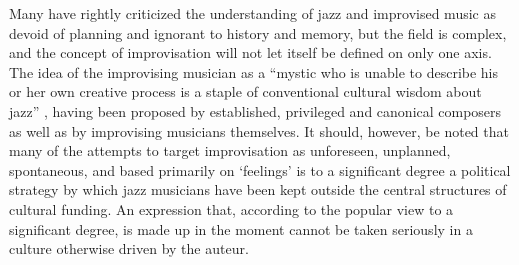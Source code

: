 \documentclass[a4paper]{article}
\begin{document}
Many have rightly criticized the understanding of jazz and improvised music as devoid of planning and ignorant to history and memory, but the field is complex, and the concept of improvisation will not let itself be defined on only one axis. The idea of the improvising musician as a ``mystic who is unable to describe his or her own creative process is a staple of conventional cultural wisdom about jazz''  \autocite[170]{lewis-1}, having been proposed by established, privileged and canonical composers as well as by improvising musicians themselves. It should, however, be noted that many of the attempts to target improvisation as unforeseen, unplanned, spontaneous, and based primarily on `feelings' is to a significant degree a political strategy by which jazz musicians have been kept outside the central structures of cultural funding. An expression that, according to the popular view to a significant degree, is made up in the moment cannot be taken seriously in a culture otherwise driven by the auteur.

\end{document}
